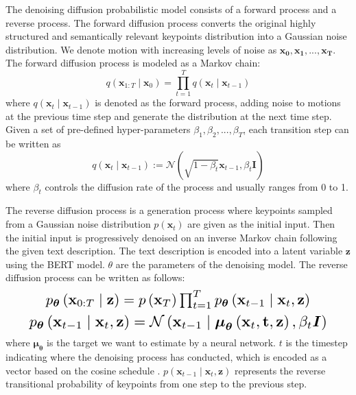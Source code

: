 \documentclass{article}
\begin{document}
The denoising diffusion probabilistic model consists of a forward process and a reverse process. The forward diffusion process converts the original highly structured and semantically relevant keypoints distribution into a Gaussian noise distribution. We denote motion with increasing levels of noise as $\mathbf{{x}_{0}}, \mathbf{{x}_{1}}, ...,\mathbf{{x}_{T}}$. The forward diffusion process is modeled as a Markov chain:
\begin{equation}
q\left(\mathbf{x}_{1: T} \mid \mathbf{x}_{0}\right)=\prod_{t=1}^{T} q\left(\mathbf{x}_{t} \mid \mathbf{x}_{t-1}\right)
\end{equation}
where $q\left(\mathbf{x}_{t} \mid \mathbf{x}_{t-1}\right)$ is denoted as the forward process, adding noise to motions at the previous time step and generate the distribution at the next time step. Given a set of pre-defined hyper-parameters $\beta_{1}, \beta_{2},...,\beta_{T}$, each transition step can be written as 
\begin{equation}
q\left(\mathbf{x}_{t} \mid \mathbf{x}_{t-1}\right):=\mathcal{N}\left(\sqrt{1-\beta_{t}} \mathbf{x}_{t-1}, \beta_{t} \mathbf{I}\right)
\end{equation}
where $\beta_{t}$ controls the diffusion rate of the process and usually ranges from 0 to 1.

The reverse diffusion process is a generation process where keypoints sampled from a Gaussian noise distribution $p\left(\mathbf{x}_{t}\right)$ are given as the initial input. Then the initial input is progressively denoised on an inverse Markov chain following the given text description. The text description is encoded into a latent variable $\mathbf{z}$ using the BERT \cite{devlin2018bert} model. $\theta$ are the parameters of the denoising model. The reverse diffusion process can be written as follows:
\begin{equation}
\resizebox{.8\hsize}{!}{$p_{\boldsymbol{\theta}}\left(\mathbf{x}_{0: T} \mid \mathbf{z}\right)=p\left(\mathbf{x}_{T}\right) \prod_{t=1}^{T} p_{\boldsymbol{\theta}}\left(\mathbf{x}_{t-1} \mid \mathbf{x}_{t}, \mathbf{z}\right)$}
\end{equation}
\vspace{-2mm}
\begin{equation}
\resizebox{.9\hsize}{!}{$p_{\boldsymbol{\theta}}\left(\mathbf{x}_{t-1} \mid \mathbf{x}_{t}, \mathbf{z}\right)=\mathcal{N}\left(\mathbf{x}_{t-1} \mid \boldsymbol{\mu}_{\boldsymbol{\theta}}\left(\mathbf{x}_{t}, \mathbf{t}, \mathbf{z}\right), \beta_{t} \boldsymbol{I}\right)$}
\end{equation}
where $\boldsymbol{\mu}_{\boldsymbol{\theta}}$ is the target we want to estimate by a neural network. $t$ is the timestep indicating where the denoising process has conducted, which is encoded as a vector based on the cosine schedule \cite{nichol2021improved}. $p\left(\mathbf{x}_{t-1} \mid \mathbf{x}_{t}, \mathbf{z}\right)$ represents the reverse transitional probability of keypoints from one step to the previous step.
\end{document}
